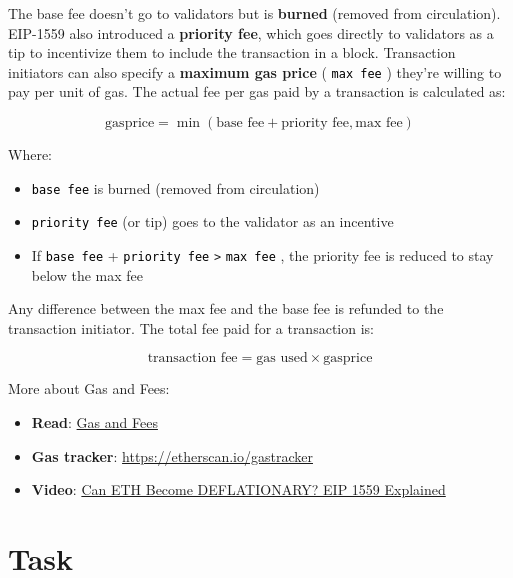 \documentclass[12pt]{article}
\newcommand{\codegrey}[1]{%
  \texttt{\colorbox{black!4}{\textcolor{black}{#1}}}%
}
\begin{document}
\noindent
The base fee doesn't go to validators but is \textbf{burned} (removed from circulation). EIP-1559 also introduced a \textbf{priority fee}, which goes directly to validators as a tip to incentivize them to include the transaction in a block. Transaction initiators can also specify a \textbf{maximum gas price} (\codegrey{max fee}) they're willing to pay per unit of gas. The actual fee per gas paid by a transaction is calculated as:

\begin{equation}
\text{gasprice} = \min(\text{base fee} + \text{priority fee}, \text{max fee})
\end{equation}

Where:
\begin{itemize}
    \item \codegrey{base fee} is burned (removed from circulation)
    \item \codegrey{priority fee} (or tip) goes to the validator as an incentive
    \item If \codegrey{base fee} + \codegrey{priority fee} \verb|>| \codegrey{max fee}, the priority fee is reduced to stay below the max fee
\end{itemize}

\noindent
Any difference between the max fee and the base fee is refunded to the transaction initiator. The total fee paid for a transaction is:

\begin{equation}
\text{transaction fee} = \text{gas used} \times \text{gasprice}
\end{equation}

\medskip
\noindent
More about Gas and Fees:
\begin{itemize}
  \item \textbf{Read}: \href{https://ethereum.org/en/developers/docs/gas/}{Gas and Fees}
  \item \textbf{Gas tracker}: \href{https://etherscan.io/gastracker}{https://etherscan.io/gastracker}
  \item \textbf{Video}: \href{https://www.youtube.com/watch?v=MGemhK9t44Q}{Can ETH Become DEFLATIONARY? EIP 1559 Explained}
\end{itemize}

\pagebreak
\section{Task}
\end{document}
